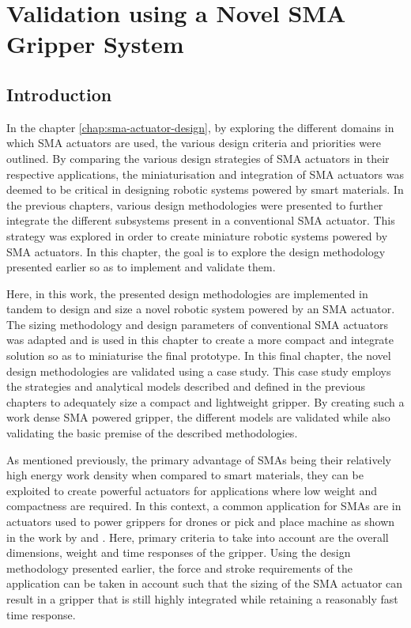 
\chapter{Validation using a Novel SMA Gripper System}\label{chap:case-study}
\section{Introduction}
In the chapter \cref{chap:sma-actuator-design}, by exploring the different domains in which SMA actuators are used, the various design criteria and priorities were outlined. By comparing the various design strategies of SMA actuators in their respective applications, the miniaturisation and integration of SMA actuators was deemed to be critical in designing robotic systems powered by smart materials. In the previous chapters, various design methodologies were presented to further integrate the different subsystems present in a conventional SMA actuator. This strategy was explored in order to create miniature robotic systems powered by SMA actuators. In this chapter, the goal is to explore the design methodology presented earlier so as to implement and validate them.

Here, in this work, the presented design methodologies are implemented in tandem to design and size a novel robotic system powered by an SMA actuator. The sizing methodology and design parameters of conventional SMA actuators was adapted and is used in this chapter to create a more compact and integrate solution so as to miniaturise the final prototype. In this final chapter, the novel design methodologies are validated using a case study. This case study employs the strategies and analytical models described and defined in the previous chapters to adequately size a compact and lightweight gripper. By creating such a work dense SMA powered gripper, the different models are validated while also validating the basic premise of the described methodologies.

As mentioned previously, the primary advantage of SMAs being their relatively high energy work density when compared to smart materials, they can be exploited to create powerful actuators for applications where low weight and compactness are required. In this context, a common application for SMAs are in actuators used to power grippers for drones or pick and place machine as shown in the work by \todocite and \todocite. Here, primary criteria to take into account are the overall dimensions, weight and time responses of the gripper. Using the design methodology presented earlier, the force and stroke requirements of the application can be taken in account such that the sizing of the SMA actuator can result in a gripper that is still highly integrated while retaining a reasonably fast time response.


